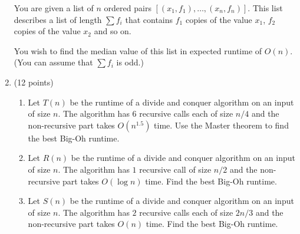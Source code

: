 \documentclass[10pt,letterpaper,unboxed,cm]{article}
\begin{document}
\begin{enumerate}
You are given a list of $n$ ordered pairs $[(x_1,f_1),\dots,(x_n,f_n)]$. This list describes a list of length $\sum f_i$ that contains $f_1$ copies of the value $x_1$, $f_2$ copies of the value $x_2$ and so on.

You wish to find the median value of this list in expected runtime of $O(n)$. (You can assume that $\sum f_i$ is odd.)




\item (12 points)
\begin{enumerate}
\item
Let $T(n)$ be the runtime of a divide and conquer algorithm on an input of size $n$. The algorithm has $6$ recursive calls each of size $n/4$ and the non-recursive part takes $O(n^{1.5})$ time. Use the Master theorem to find the best Big-Oh runtime.

\item
Let $R(n)$ be the runtime of a divide and conquer algorithm on an input of size $n$. The algorithm has $1$ recursive call of size $n/2$ and the non-recursive part takes $O(\log n)$ time. Find the best Big-Oh runtime.

\item
Let $S(n)$ be the runtime of a divide and conquer algorithm on an input of size $n$. The algorithm has $2$ recursive calls each of size $2n/3$ and the non-recursive part takes $O(n)$ time. Find the best Big-Oh runtime.
\end{enumerate}

\end{enumerate}
\end{document}
